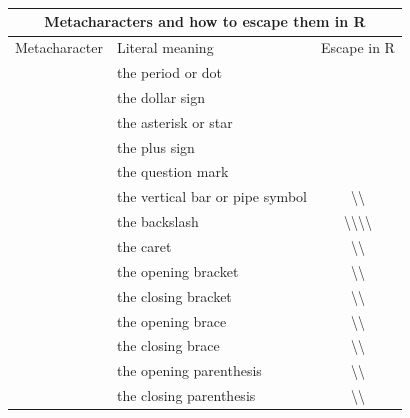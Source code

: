 \documentclass[12pt]{beamer}\usepackage[]{graphicx}\usepackage[]{color}
\begin{document}

\begin{frame}[fragile]
\frametitle{}

\begin{center}
 \begin{tabular}{c l c}
  \multicolumn{3}{c}{\textbf{Metacharacters and how to escape them in R}} \\
 \hline
  Metacharacter & Literal meaning & Escape in R \\
  \hline
  \code{.} & the period or dot & \code{\textbackslash{\textbackslash{.}}} \\
  \code{\$} & the dollar sign & \code{\textbackslash{\textbackslash{\$}}} \\  
  \code{*} & the asterisk or star & \code{\textbackslash{\textbackslash{*}}} \\
  \code{+} & the plus sign & \code{\textbackslash{\textbackslash{+}}} \\
  \code{?} & the question mark & \code{\textbackslash{\textbackslash{?}}} \\
  \code{|} & the vertical bar or pipe symbol & \textbackslash{\textbackslash{\code{|}}} \\
  \code{\textbackslash{}} & the backslash & \textbackslash{\textbackslash{\textbackslash{\textbackslash{}}}} \\
  \code{\^} & the caret & \textbackslash{\textbackslash{\code{\^}}} \\
  \code{[} & the opening bracket & \textbackslash{\textbackslash{\code{[}}} \\
  \code{]} & the closing bracket & \textbackslash{\textbackslash{\code{]}}} \\
  \code{\{} & the opening brace & \textbackslash{\textbackslash{\code{\{}}} \\
  \code{\}} & the closing brace & \textbackslash{\textbackslash{\code{\}}}} \\
  \code{(} & the opening parenthesis & \textbackslash{\textbackslash{\code{(}}} \\
  \code{)} & the closing parenthesis & \textbackslash{\textbackslash{\code{)}}} \\
  \hline
 \end{tabular}
\end{center}

\end{frame}

\end{document}
